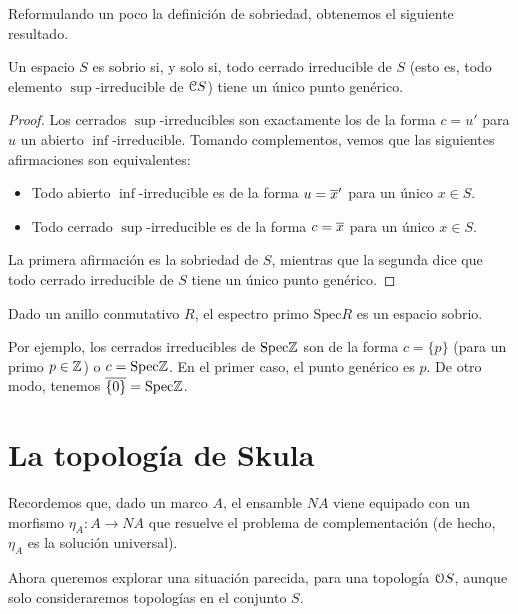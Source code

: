 Reformulando un poco la definición de sobriedad,
obtenemos el siguiente resultado.
\begin{lemma}
    Un espacio $S$ es sobrio si, y solo si,
    todo cerrado irreducible de $S$
    (esto es, todo elemento $\sup$-irreducible de $\cal CS$)
    tiene un único punto genérico.
\end{lemma}
\begin{proof}
    Los cerrados $\sup$-irreducibles son exactamente
    los de la forma $c=u'$ para $u$ un abierto $\inf$-irreducible.
    Tomando complementos, vemos que las siguientes afirmaciones
    son equivalentes:
    \begin{itemize}
         \item Todo abierto $\inf$-irreducible es de
         la forma $u=\ol{x}'$ para un único $x\in S$.
         \item Todo cerrado $\sup$-irreducible es de
         la forma $c=\ol x$ para un único $x\in S$.
    \end{itemize}
    La primera afirmación es la sobriedad de $S$,
    mientras que la segunda dice que todo cerrado
    irreducible de $S$ tiene un único punto genérico.
\end{proof}

\begin{example}
    Dado un anillo conmutativo $R$,
    el espectro primo $\mathrm{Spec}R$ es un espacio sobrio.
    
    Por ejemplo, los cerrados irreducibles de $\mathrm{Spec}\Z$ son
    de la forma $c=\{p\}$ (para un primo $p\in\Z$) o $c=\mathrm{Spec}\Z$.
    En el primer caso, el punto genérico es $p$.
    De otro modo, tenemos $\ol{\{0\}}=\mathrm{Spec}\Z$.
\end{example}


\section{La topología de Skula}

Recordemos que, dado un marco $A$, el ensamble $NA$ viene equipado con
un morfismo $\eta_A:A\to NA$ que resuelve el problema de complementación
(de hecho, $\eta_A$ es la solución universal).

Ahora queremos explorar una situación parecida, para una topología
$\cal OS$, aunque solo consideraremos topologías en el conjunto $S$.

